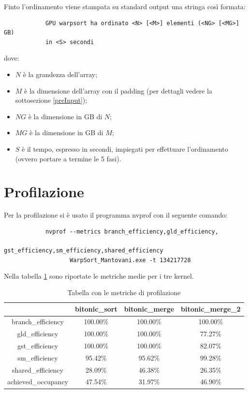 \documentclass[a4paper, 11pt]{article}
\begin{document}
		Finto l'ordinamento viene stampata su standard output una stringa così formata:
		\begin{verbatim}
			GPU warpsort ha ordinato <N> [<M>] elementi (<NG> [<MG>] GB) 
			in <S> secondi
		\end{verbatim}
		dove:
		\begin{itemize}
			\item $N$ è la grandezza dell'array;
			\item $M$ è la dimensione dell'array con il padding (per dettagli vedere la sottosezione \ref{preInput});
			\item $NG$ è la dimensione in GB di $N$;
			\item $MG$ è la dimensione in GB di $M$;
			\item $S$ è il tempo, espresso in secondi, impiegati per effettuare l'ordinamento (ovvero portare a termine le 5 fasi).
		\end{itemize}	
	\section{Profilazione}
		Per la profilazione si è usato il programma nvprof con il seguente comando:
		
		\begin{verbatim}
			nvprof --metrics branch_efficiency,gld_efficiency,
			                 gst_efficiency,sm_efficiency,shared_efficiency 
			       WarpSort_Mantovani.exe -t 134217728
		\end{verbatim}
		
		Nella tabella \ref{tab:prof} sono riportate le metriche medie per i tre kernel.
		\begin{table}[h]			
			\centering
			\begin{tabular}{c|ccc}
								    & bitonic\_sort & bitonic\_merge & bitonic\_merge\_2 \\
		        \hline
				branch\_efficiency  & 100.00\%      & 100.00\%       & 100.00\%          \\
				gld\_efficiency     & 100.00\%      & 100.00\%       &  77.27\%          \\
				gst\_efficiency     & 100.00\%      & 100.00\%       &  82.07\%          \\
				sm\_efficiency      &  95.42\%      &  95.62\%       &  99.28\%          \\
				shared\_efficiency  &  28.09\%      &  46.38\%       &  26.35\%          \\
				achieved\_occupancy &  47.54\%      &  31.97\%       &  46.90\%          \\
			\end{tabular}
			\caption{Tabella con le metriche di profilazione}
			\label{tab:prof}
			\end{table}
		
\end{document}
